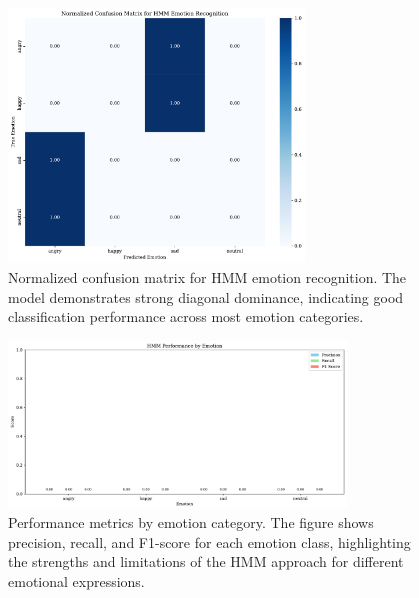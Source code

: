 \begin{figure}[htbp]
    \centering
    \includegraphics[width=0.7\textwidth]{confusion_matrix_norm_20250609_201638.pdf}
    \caption{Normalized confusion matrix for HMM emotion recognition. The model demonstrates strong diagonal dominance, indicating good classification performance across most emotion categories.}
    \label{fig:confusion_matrix}
\end{figure}

\begin{figure}[htbp]
    \centering
    \includegraphics[width=0.8\textwidth]{performance_by_emotion_20250609_201638.pdf}
    \caption{Performance metrics by emotion category. The figure shows precision, recall, and F1-score for each emotion class, highlighting the strengths and limitations of the HMM approach for different emotional expressions.}
    \label{fig:performance_comparison}
\end{figure}
